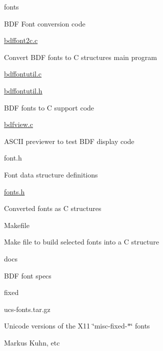 fonts
\begin{DoxyItemize}
\item B\+DF Font conversion code
\begin{DoxyItemize}
\item \hyperlink{bdffont2c_8c}{bdffont2c.\+c}
\begin{DoxyItemize}
\item Convert B\+DF fonts to C structures main program
\end{DoxyItemize}
\item \hyperlink{bdffontutil_8c}{bdffontutil.\+c}
\item \hyperlink{bdffontutil_8h}{bdffontutil.\+h}
\begin{DoxyItemize}
\item B\+DF fonts to C support code
\end{DoxyItemize}
\item \hyperlink{bdfview_8c}{bdfview.\+c}
\begin{DoxyItemize}
\item A\+S\+C\+II previewer to test B\+DF display code
\end{DoxyItemize}
\item font.\+h
\begin{DoxyItemize}
\item Font data structure definitions
\end{DoxyItemize}
\item \hyperlink{fonts_8h}{fonts.\+h}
\begin{DoxyItemize}
\item Converted fonts as C structures
\end{DoxyItemize}
\item Makefile
\begin{DoxyItemize}
\item Make file to build selected fonts into a C structure
\end{DoxyItemize}
\item docs
\begin{DoxyItemize}
\item B\+DF font specs
\end{DoxyItemize}
\item fixed
\begin{DoxyItemize}
\item ucs-\/fonts.\+tar.\+gz
\item Unicode versions of the X11 \char`\"{}misc-\/fixed-\/$\ast$\char`\"{} fonts
\item Markus Kuhn, etc
\end{DoxyItemize}

\end{DoxyItemize}
\end{DoxyItemize}
